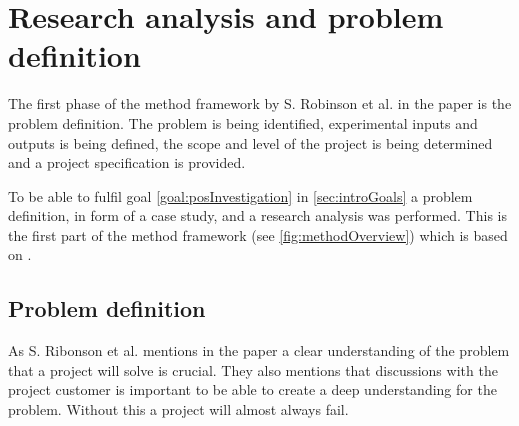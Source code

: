 \section{Research analysis and problem definition}\label{sec:methodProblemDefinition}
The first phase of the method framework by S. Robinson et al. in the paper \cite{SecretsSuccessfulSimulation1995} is the problem definition.
The problem is being identified, experimental inputs and outputs is being defined, the scope and level of the project is being determined and a project specification is provided.





\bigskip

To be able to fulfil goal \ref{goal:posInvestigation} in \cref{sec:introGoals} a problem definition, in form of a case study, and a research analysis was performed.
This is the first part of the method framework (see \cref{fig:methodOverview}) which is based on \cite{SecretsSuccessfulSimulation1995}.


\subsection{Problem definition}\label{sec:methodProblemDefinition}
As S. Ribonson et al. mentions in the paper \cite{SecretsSuccessfulSimulation1995} a clear understanding of the problem that a project will solve is crucial.
They also mentions that discussions with the project customer is important to be able to create a deep understanding for the problem.
Without this a project will almost always fail.

